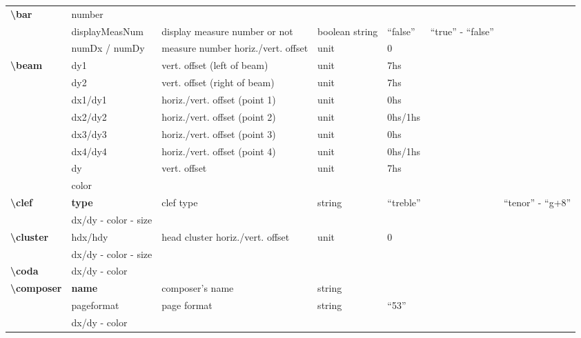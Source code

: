 \documentclass[a4paper, landscape, 10pt]{article}
\begin{document}
\begin{tabularx}{\linewidth}{p{3cm}p{3cm}p{6cm}p{2.5cm}p{2.5cm}p{3.5cm}p{3.5cm}}
    \textbf{\textbackslash{}bar}&number&&&&&\\ %
    &displayMeasNum&display measure number or not&boolean string&``false''&``true'' - ``false''&\\
    &numDx / numDy&measure number horiz./vert. offset&unit&0&&\\
    \hline
    \textbf{\textbackslash{}beam}&dy1&vert. offset (left of beam)&unit&7hs&&\\
    &dy2&vert. offset (right of beam)&unit&7hs&&\\
    &dx1/dy1&horiz./vert. offset (point 1)&unit&0hs&&\\
    &dx2/dy2&horiz./vert. offset (point 2)&unit&0hs/1hs&&\\
    &dx3/dy3&horiz./vert. offset (point 3)&unit&0hs&&\\
    &dx4/dy4&horiz./vert. offset (point 4)&unit&0hs/1hs&&\\
    &dy&vert. offset&unit&7hs&&\\
    &color&&&&&\\
    \hline
    \textbf{\textbackslash{}clef}&\textbf{type}&clef type&string&``treble''&&``tenor'' - ``g+8''\\
    &dx/dy - color - size&&&&&\\
    \hline
    \textbf{\textbackslash{}cluster}&hdx/hdy&head cluster horiz./vert. offset&unit&0&&\\
    &dx/dy - color - size&&&&&\\
    \hline
    \textbf{\textbackslash{}coda}&dx/dy - color&&&&&\\
    \hline
    \textbf{\textbackslash{}composer}&\textbf{name}&composer's name&string&&&\\
    &pageformat&page format&string&``53''&&\\ %
    &dx/dy - color&&&&&\\
    \hline
\end{tabularx}
\end{document}
